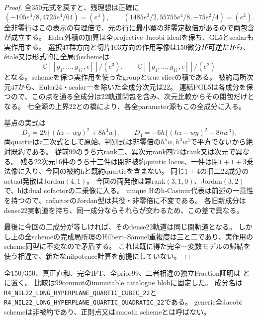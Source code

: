 \documentclass[a4paper,11pt]{ltjsarticle}
\theoremstyle{definition}
\begin{document}
\begin{proof}
全350元式を戻すと、残理想は正確に
\[
 (-105e^3/8,4725e^4/64)=(e^3),\qquad
 (1485e^3/2,55755e^4/8,-75e^2/4)=(e^2).
\]
全非零行はこの表示の有理倍で、元の行に最小冪の非零定数倍があるので両包含が成立する。
Euler外積の加算は全projective Jacobi idealを保ち、GL5とscalarも実作用する。
選択47群方向と切片103方向の作用写像は150微分が可逆だから、étale又は形式的に全局所schemeは
\[
 \mathbb C[[g_1,\ldots,g_{47},e]]/(e^3),\qquad
 \mathbb C[[g_1,\ldots,g_{47},e]]/(e^2)
\]
となる。schemeを保つ実作用を使ったgroupとtrue sliceの積である。
被約局所次元47から、Euler24・scalar一を除いた全成分次元は22。
連結PGL5は各成分を保つので、この点を通る全成分は22軌道閉包を含み、次元比較からその閉包だけとなる。
七全源の上界22との橋により、各全parameter源もこの全成分に入る。

基点の実式は
\[
 D_3=2h\{(hz-wy)^2+8h^3w\},\qquad D_4=-6h\{(hz-wy)^2-8hw^3\}.
\]
両quarticはz二次式として原始、判別式は非零倍の$h^5w,h^3w^3$で平方でないから絶対既約である。
従前99のうち六rank二、異次元rank四77はrank又は次元で異なる。
残る22次元16件のうち十三件は閉非被約quintic locus、一件は閉$1+1+3$乗法像に入り、今回の被約hと既約quarticを含まない。
同じ$1+4$の旧二22成分のactual発散はJordan$(4,1)$。
今回の両発散は冪rank$(3,1,0)$、Jordan$(3,2)$で、hはdual cofactorの二乗像に入る。
unique Hのh-Casimir代表は前述の一意性を持つので、cofactorのJordan型は共役・非零倍に不変である。
各旧新成分はdense22実軌道を持ち、同一成分ならそれらが交わるため、この差で異なる。

最後に今回の二成分が等しければ、そのdense22軌道は同じ開軌道となる。
しかし上の全schemeの完成局所環のHilbert--Samuel重複度は三と二であり、実作用のscheme同型に不変なので矛盾する。
これは既に得た完全一変数モデルの帰結を使う相違で、新たなnilpotence計算を前提にしていない。
\end{proof}
全150/350、真正直和、完全IFT、全prior99、二者相違の独立Fraction証明は
と
に置く。
比較は99commitのimmutable catalogue blobに固定した。
成分名は\texttt{R4\_NIL22\_LONG\_HYPERPLANE\_QUARTIC\_CUBIC\_22}と
\texttt{R4\_NIL22\_LONG\_HYPERPLANE\_QUARTIC\_QUADRATIC\_22}である。
generic全Jacobi schemeは非被約であり、正則点又はsmooth schemeとは呼ばない。
\end{document}
